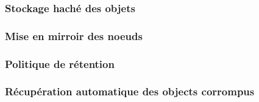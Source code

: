 \documentclass[12pt,a4paper]{report}
\theoremstyle{definition}
\begin{document}
\subsubsection{Stockage haché des objets}

\subsubsection{Mise en mirroir des noeuds}

\subsubsection{Politique de rétention}

\subsubsection{Récupération automatique des objects corrompus}
\end{document}
